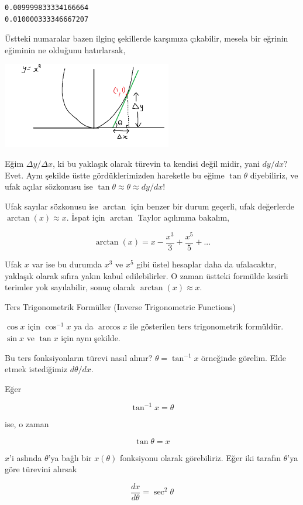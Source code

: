 \documentclass[12pt,fleqn]{article}\usepackage{../../common}
\begin{document}
\begin{verbatim}
0.009999833334166664
0.010000333346667207
\end{verbatim}

Üstteki numaralar bazen ilginç şekillerde karşımıza çıkabilir, mesela bir
eğrinin eğiminin ne olduğunu hatırlarsak,

\includegraphics[width=20em]{ode_mattuck_50_trig_03.png}

Eğim $\Delta y / \Delta x$, ki bu yaklaşık olarak türevin ta kendisi değil
midir, yani $dy / dx$? Evet. Aynı şekilde üstte gördüklerimizden hareketle
bu eğime $\tan\theta$ diyebiliriz, ve ufak açılar sözkonusu ise
$\tan\theta \approx \theta \approx dy / dx$!

Ufak sayılar sözkonusu ise $\arctan$ için benzer bir durum geçerli, ufak
değerlerde $\arctan(x) \approx x$. İspat için $\arctan$ Taylor açılımına
bakalım,

$$
\arctan(x) = x - \frac{x^3}{3} + \frac{x^5}{5} + ...
$$

Ufak $x$ var ise bu durumda $x^3$ ve $x^5$ gibi üstel hesaplar daha da
ufalacaktır, yaklaşık olarak sıfıra yakın kabul edilebilirler. O zaman üstteki
formülde kesirli terimler yok sayılabilir, sonuç olarak $\arctan(x) \approx x$.

Ters Trigonometrik Formüller (Inverse Trigonometric Functions)

$\cos x$ için $\cos^{-1} x$ ya da $\arccos x$ ile gösterilen ters
trigonometrik formüldür. $\sin x$ ve $\tan x$ için aynı şekilde. 

Bu ters fonksiyonların türevi nasıl alınır? $\theta = \tan^{-1}x$ örneğinde
görelim. Elde etmek istediğimiz $d\theta/dx$. 

Eğer

$$ \tan^{-1}x = \theta$$

ise, o zaman 

$$ \tan\theta = x $$

$x$'i aslında $\theta$'ya bağlı bir $x(\theta)$ fonksiyonu olarak görebiliriz. 
Eğer iki tarafın $\theta$'ya göre türevini alırsak

$$ \frac{dx}{d\theta} = \sec^{2}\theta $$
\end{document}
